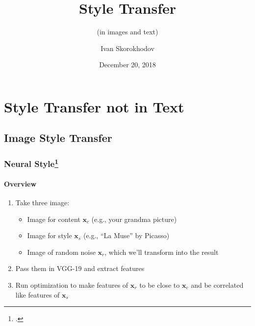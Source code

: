 \documentclass[10pt]{beamer}
\title{Style Transfer}
\subtitle{(in images and text)}
\author{Ivan Skorokhodov}
\date{December 20, 2018}
\begin{document}
\begin{frame}
    \titlepage
\end{frame}




\section{Style Transfer not in Text}
\subsection{Image Style Transfer}


\begin{frame}    
\frametitle{Neural Style\footcite{NeuralStyle}}
\framesubtitle{Overview}
\begin{enumerate}
    \item Take three image:
    \begin{itemize}
        \item Image for content $\bm x_c$ (e.g., your grandma picture)
        \item Image for style $\bm x_s$ (e.g., ``La Muse'' by Picasso)
        \item Image of random noise $\bm x_r$, which we'll transform into the result
    \end{itemize}
    \item Pass them in VGG-19 and extract features
    \item Run optimization to make features of $\bm x_r$ to be close to $\bm x_c$ and be correlated like features of $\bm x_s$
\end{enumerate}


\end{frame}
\end{document}
